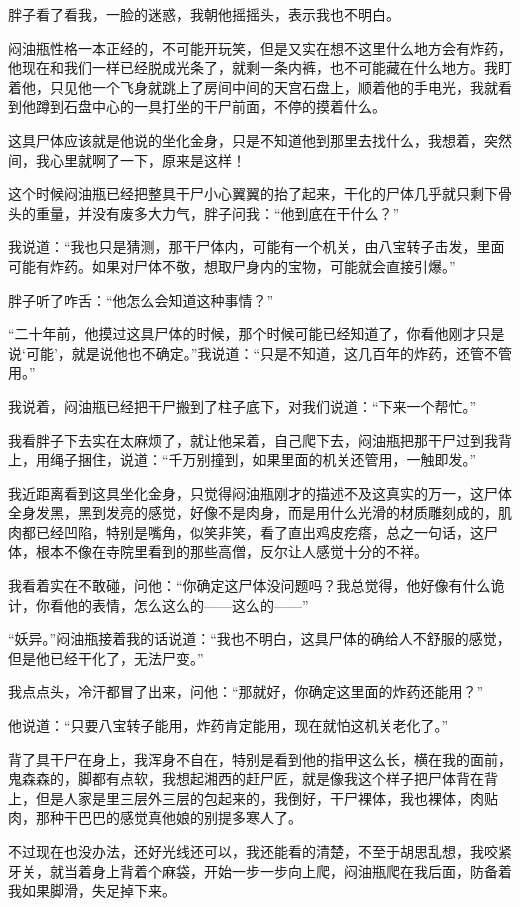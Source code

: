 胖子看了看我，一脸的迷惑，我朝他摇摇头，表示我也不明白。

闷油瓶性格一本正经的，不可能开玩笑，但是又实在想不这里什么地方会有炸药，他现在和我们一样已经脱成光条了，就剩一条内裤，也不可能藏在什么地方。我盯着他，只见他一个飞身就跳上了房间中间的天宫石盘上，顺着他的手电光，我就看到他蹲到石盘中心的一具打坐的干尸前面，不停的摸着什么。

这具尸体应该就是他说的坐化金身，只是不知道他到那里去找什么，我想着，突然间，我心里就啊了一下，原来是这样！

这个时候闷油瓶已经把整具干尸小心翼翼的抬了起来，干化的尸体几乎就只剩下骨头的重量，并没有废多大力气，胖子问我：“他到底在干什么？”

我说道：“我也只是猜测，那干尸体内，可能有一个机关，由八宝转子击发，里面可能有炸药。如果对尸体不敬，想取尸身内的宝物，可能就会直接引爆。”

胖子听了咋舌：“他怎么会知道这种事情？”

“二十年前，他摸过这具尸体的时候，那个时候可能已经知道了，你看他刚才只是说‘可能’，就是说他也不确定。”我说道：“只是不知道，这几百年的炸药，还管不管用。”

我说着，闷油瓶已经把干尸搬到了柱子底下，对我们说道：“下来一个帮忙。”

我看胖子下去实在太麻烦了，就让他呆着，自己爬下去，闷油瓶把那干尸过到我背上，用绳子捆住，说道：“千万别撞到，如果里面的机关还管用，一触即发。”

我近距离看到这具坐化金身，只觉得闷油瓶刚才的描述不及这真实的万一，这尸体全身发黑，黑到发亮的感觉，好像不是肉身，而是用什么光滑的材质雕刻成的，肌肉都已经凹陷，特别是嘴角，似笑非笑，看了直出鸡皮疙瘩，总之一句话，这尸体，根本不像在寺院里看到的那些高僧，反尔让人感觉十分的不祥。

我看着实在不敢碰，问他：“你确定这尸体没问题吗？我总觉得，他好像有什么诡计，你看他的表情，怎么这么的——这么的——”

“妖异。”闷油瓶接着我的话说道：“我也不明白，这具尸体的确给人不舒服的感觉，但是他已经干化了，无法尸变。”

我点点头，冷汗都冒了出来，问他：“那就好，你确定这里面的炸药还能用？”

他说道：“只要八宝转子能用，炸药肯定能用，现在就怕这机关老化了。”

背了具干尸在身上，我浑身不自在，特别是看到他的指甲这么长，横在我的面前，鬼森森的，脚都有点软，我想起湘西的赶尸匠，就是像我这个样子把尸体背在背上，但是人家是里三层外三层的包起来的，我倒好，干尸裸体，我也裸体，肉贴肉，那种干巴巴的感觉真他娘的别提多寒人了。

不过现在也没办法，还好光线还可以，我还能看的清楚，不至于胡思乱想，我咬紧牙关，就当着身上背着个麻袋，开始一步一步向上爬，闷油瓶爬在我后面，防备着我如果脚滑，失足掉下来。

